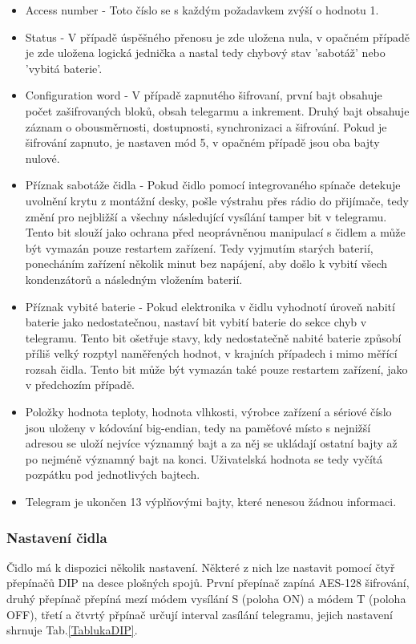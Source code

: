 \begin{itemize}
	\item Access number - Toto číslo se s každým požadavkem zvýší o hodnotu 1.
	\item Status - V případě úspěšného přenosu je zde uložena nula, v opačném případě je zde uložena logická jednička a nastal tedy chybový stav 'sabotáž' nebo 'vybitá baterie'.
	\item Configuration word - V případě zapnutého šifrovaní, první bajt obsahuje počet zašifrovaných bloků, obsah telegarmu a inkrement. Druhý bajt obsahuje záznam o obousměrnosti, dostupnosti, synchronizaci a šifrování. Pokud je šifrování zapnuto, je nastaven mód 5, v opačném případě jsou oba bajty nulové.
	\item Příznak sabotáže čidla - Pokud čidlo pomocí integrovaného spínače detekuje uvolnění krytu z montážní desky, pošle výstrahu přes rádio do přijímače, tedy změní pro nejbližší a všechny následující vysílání tamper bit v telegramu. Tento bit slouží jako ochrana před neoprávněnou manipulací s čidlem a může být vymazán pouze restartem zařízení. Tedy vyjmutím starých baterií, ponecháním zařízení několik minut bez napájení, aby došlo k vybití všech kondenzátorů a následným vložením baterií.
\item Příznak vybité baterie - Pokud elektronika v čidlu vyhodnotí úroveň nabití baterie jako nedostatečnou, nastaví bit vybití baterie do sekce chyb v telegramu. Tento bit ošetřuje stavy, kdy nedostatečně nabité baterie způsobí příliš velký rozptyl naměřených hodnot, v krajních případech i mimo měřící rozsah čidla. Tento bit může být vymazán také pouze restartem zařízení, jako v předchozím případě.
\item Položky hodnota teploty, hodnota vlhkosti, výrobce zařízení a sériové číslo jsou uloženy v kódování big-endian, tedy na paměťové místo s nejnižší adresou se uloží nejvíce významný bajt a za něj se ukládají ostatní bajty až po nejméně významný bajt na konci. Uživatelská hodnota se tedy vyčítá pozpátku pod jednotlivých bajtech.
\item Telegram je ukončen 13 výplňovými bajty, které nenesou žádnou informaci.
\end{itemize}


\subsubsection{Nastavení čidla}
Čidlo má k dispozici několik nastavení. Některé z nich lze nastavit pomocí čtyř přepínačů DIP na desce plošných spojů.
První přepínač zapíná AES-128 šifrování, druhý přepínač přepíná mezí módem vysílání S (poloha ON) a módem T (poloha OFF), třetí a čtvrtý přpínač určují interval zasílání telegramu, jejich nastavení shrnuje Tab.\ref{TablukaDIP}.

